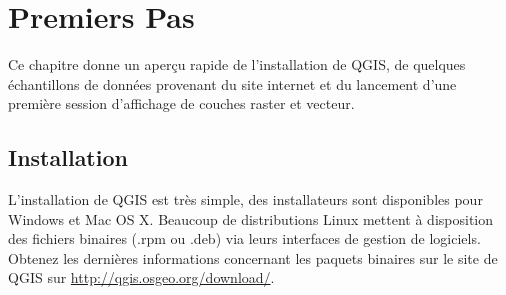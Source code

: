 %

\section{Premiers Pas}\label{label_getstarted}

Ce chapitre donne un aperçu rapide de l'installation de QGIS, de quelques échantillons de données provenant du site internet et du lancement d'une première session d'affichage de couches raster et vecteur.

%
%

\subsection{Installation}\label{label_installation} 

L'installation de QGIS est très simple, des installateurs sont disponibles pour Windows et Mac OS X. Beaucoup de distributions Linux mettent à disposition des fichiers binaires (.rpm ou .deb) via leurs interfaces de gestion de logiciels. Obtenez les dernières informations concernant les paquets binaires sur le site de QGIS sur \url{http://qgis.osgeo.org/download/}.

